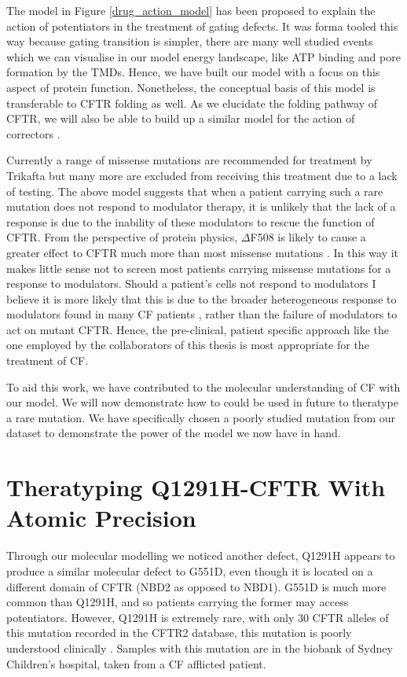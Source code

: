 The model in Figure \ref {drug_action_model} has been proposed to explain the action of potentiators in the treatment of gating defects. It was forma tooled this way because gating transition is simpler, there are many well studied events which we can visualise in our model energy landscape, like ATP binding and pore formation by the TMDs. Hence, we have built our model with a focus on this aspect of protein function. Nonetheless, the conceptual basis of this model is transferable to CFTR folding as well. As we elucidate the folding pathway of CFTR, we will also be able to build up a similar model for the action of correctors \cite{krainer2018, kleizen2021, kleizen2020, padanyi2022, fiedorczuk2022}. 

Currently a range of missense mutations are recommended for treatment by Trikafta but many more are excluded from receiving this treatment due to a lack of testing. The above model suggests that when a patient carrying such a rare mutation does not respond to modulator therapy, it is unlikely that the lack of a response is due to the inability of these modulators to rescue the function of CFTR. From the perspective of protein physics, $\Delta$F508 is likely to cause a greater effect to CFTR much more than most missense mutations \cite{bahia2021}. In this way it makes little sense not to screen most patients carrying missense mutations for a response to modulators. Should a patient's cells not respond to modulators I believe it is more likely that this is due to the broader heterogeneous response to modulators found in many CF patients \cite{boyle2014, donaldson2018, keating2018, matthes2018}, rather than the failure of modulators to act on mutant CFTR. Hence, the pre-clinical, patient specific approach like the one employed by the collaborators of this thesis is most appropriate for the treatment of CF. 

To aid this work, we have contributed to the molecular understanding of CF with our model. We will now demonstrate how to could be used in future to theratype a rare mutation. We have specifically chosen a poorly studied mutation from our dataset to demonstrate the power of the model we now have in hand. 

\section{Theratyping Q1291H-CFTR With Atomic Precision}

Through our molecular modelling we noticed another defect, Q1291H appears to produce a similar molecular defect to G551D, even though it is located on a different domain of CFTR (NBD2 as opposed to NBD1). G551D is much more common than Q1291H, and so patients carrying the former may access potentiators. However, Q1291H is extremely rare, with only 30 CFTR alleles of this mutation recorded in the CFTR2 database, this mutation is poorly understood clinically \cite{cftr2}. Samples with this mutation are in the biobank of Sydney Children's hospital, taken from a CF afflicted patient. 

